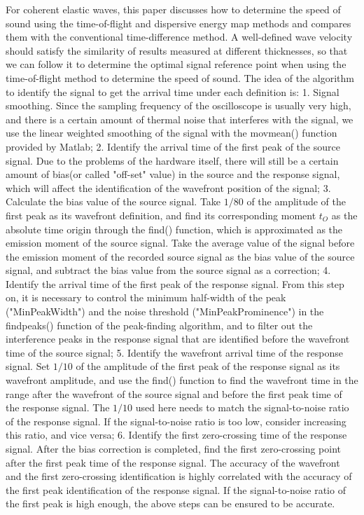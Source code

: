 \begin{digest}
    For coherent elastic waves, this paper discusses how to determine the speed of sound using the time-of-flight and dispersive energy map methods and compares them with the conventional time-difference method. A well-defined wave velocity should satisfy the similarity of results measured at different thicknesses, so that we can follow it to determine the optimal signal reference point when using the time-of-flight method to determine the speed of sound. The idea of the algorithm to identify the signal to get the arrival time under each definition is:
    1. Signal smoothing. Since the sampling frequency of the oscilloscope is usually very high, and there is a certain amount of thermal noise that interferes with the signal, we use the linear weighted smoothing of the signal with the movmean() function provided by Matlab;
    2. Identify the arrival time of the first peak of the source signal. Due to the problems of the hardware itself, there will still be a certain amount of bias(or called "off-set" value) in the source and the response signal, which will affect the identification of the wavefront position of the signal;
    3. Calculate the bias value of the source signal. Take $1/80$ of the amplitude of the first peak as its wavefront definition, and find its corresponding moment $t_{O}$ as the absolute time origin through the find() function, which is approximated as the emission moment of the source signal. Take the average value of the signal before the emission moment of the recorded source signal as the bias value of the source signal, and subtract the bias value from the source signal as a correction; 
    4. Identify the arrival time of the first peak of the response signal. From this step on, it is necessary to control the minimum half-width of the peak ("MinPeakWidth") and the noise threshold ("MinPeakProminence") in the findpeaks() function of the peak-finding algorithm, and to filter out the interference peaks in the response signal that are identified before the wavefront time of the source signal;
    5. Identify the wavefront arrival time of the response signal. Set $1/10$ of the amplitude of the first peak of the response signal as its wavefront amplitude, and use the find() function to find the wavefront time in the range after the wavefront of the source signal and before the first peak time of the response signal. The $1/10$ used here needs to match the signal-to-noise ratio of the response signal. If the signal-to-noise ratio is too low, consider increasing this ratio, and vice versa;
    6. Identify the first zero-crossing time of the response signal. After the bias correction is completed, find the first zero-crossing point after the first peak time of the response signal. The accuracy of the wavefront and the first zero-crossing identification is highly correlated with the accuracy of the first peak identification of the response signal. If the signal-to-noise ratio of the first peak is high enough, the above steps can be ensured to be accurate.


\end{digest}
